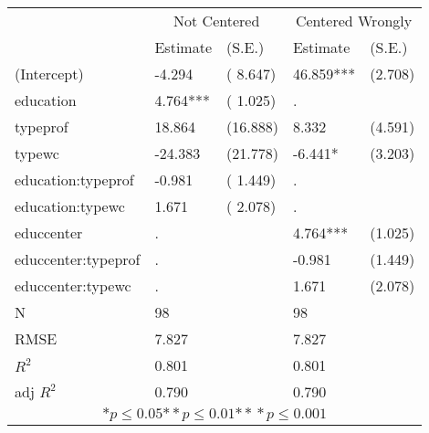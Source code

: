 \begin{tabular}{*{5}{l}}
\hline
                  & \multicolumn{2}{c}{Not Centered} & \multicolumn{2}{c}{Centered Wrongly}   \tabularnewline
                   &Estimate  &(S.E.)    &Estimate  &(S.E.)  \tabularnewline
 \hline
 \hline
   (Intercept)     &-4.294   &   ( 8.647) &46.859***   &   (2.708) \tabularnewline
   education       &4.764***   &   ( 1.025)   & .        &         \tabularnewline
   typeprof        &18.864   &   (16.888) &8.332   &   (4.591) \tabularnewline
   typewc          &-24.383   &   (21.778) &-6.441*   &   (3.203) \tabularnewline
   education:typeprof    &-0.981   &   ( 1.449)   & .        &         \tabularnewline
   education:typewc    &1.671   &   ( 2.078)   & .        &         \tabularnewline
   educcenter        & .        &         &4.764***   &   (1.025) \tabularnewline
   educcenter:typeprof      & .        &         &-0.981   &   (1.449) \tabularnewline
   educcenter:typewc      & .        &         &1.671   &   (2.078) \tabularnewline
 \hline
 N                 &98       &        &98       &        \tabularnewline
 RMSE             &7.827         & &7.827         & \tabularnewline
 $R^2$             &0.801         & &0.801         & \tabularnewline
 adj $R^2$         &0.790         & &0.790         & \tabularnewline
 \hline
\hline
 
 \multicolumn{5}{c}{${*  p}\le 0.05$${*\!\!*  p}\le 0.01$${*\!\!*\!\!*  p}\le 0.001$}\tabularnewline
 \end{tabular}